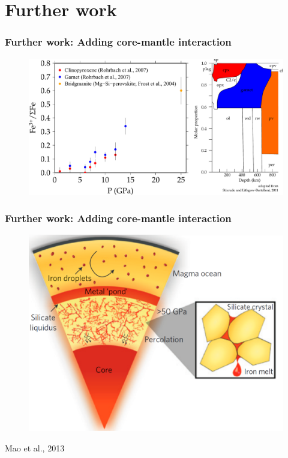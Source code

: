 \documentclass[compress,framenumber]{beamer}
\begin{document}
\section{Further work}

\begin{frame}
  \frametitle{Further work: Adding core-mantle interaction}
  \vspace{-2.0em}
  \begin{figure}
    \includegraphics[width=0.8\linewidth]{figures/ferric_depth_combined.pdf}
  \end{figure}
\end{frame}

\begin{frame}
  \frametitle{Further work: Adding core-mantle interaction}
  \vspace{-2.0em}
  \begin{figure}
    \includegraphics[width=0.75\linewidth]{figures/differentiation.pdf}
  \end{figure}
  \vspace{-2.0em}
  \hfill Mao et al., 2013
\end{frame}
\end{document}
